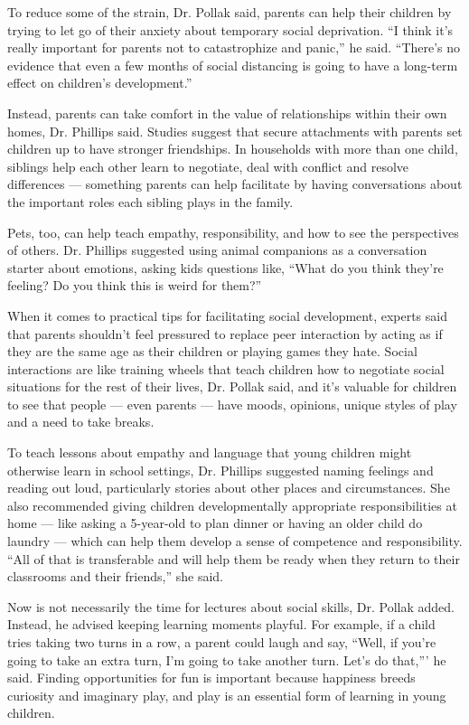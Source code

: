 To reduce some of the strain, Dr. Pollak said, parents can help their
children by trying to let go of their anxiety about temporary social
deprivation. ``I think it's really important for parents not to
catastrophize and panic,'' he said. ``There's no evidence that even a
few months of social distancing is going to have a long-term effect on
children's development.''

Instead, parents can take comfort in the value of relationships within
their own homes, Dr. Phillips said. Studies suggest that secure
attachments with parents set children up to have stronger friendships.
In households with more than one child, siblings help each other learn
to negotiate, deal with conflict and resolve differences --- something
parents can help facilitate by having conversations about the important
roles each sibling plays in the family.

Pets, too, can help teach empathy, responsibility, and how to see the
perspectives of others. Dr. Phillips suggested using animal companions
as a conversation starter about emotions, asking kids questions like,
``What do you think they're feeling? Do you think this is weird for
them?''

When it comes to practical tips for facilitating social development,
experts said that parents shouldn't feel pressured to replace peer
interaction by acting as if they are the same age as their children or
playing games they hate. Social interactions are like training wheels
that teach children how to negotiate social situations for the rest of
their lives, Dr. Pollak said, and it's valuable for children to see that
people --- even parents --- have moods, opinions, unique styles of play
and a need to take breaks.

To teach lessons about empathy and language that young children might
otherwise learn in school settings, Dr. Phillips suggested naming
feelings and reading out loud, particularly stories about other places
and circumstances. She also recommended giving children developmentally
appropriate responsibilities at home --- like asking a 5-year-old to
plan dinner or having an older child do laundry --- which can help them
develop a sense of competence and responsibility. ``All of that is
transferable and will help them be ready when they return to their
classrooms and their friends,'' she said.

Now is not necessarily the time for lectures about social skills, Dr.
Pollak added. Instead, he advised keeping learning moments playful. For
example, if a child tries taking two turns in a row, a parent could
laugh and say, ``Well, if you're going to take an extra turn, I'm going
to take another turn. Let's do that,''' he said. Finding opportunities
for fun is important because happiness breeds curiosity and imaginary
play, and play is an essential form of learning in young children.

